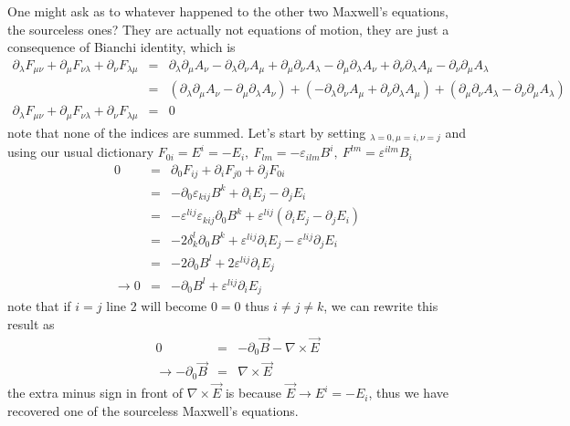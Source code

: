 \documentclass[aps,preprint,preprintnumbers,nofootinbib,showpacs,prd]{revtex4-1}
\newcommand{\nbea}{\begin{eqnarray*}}
\newcommand{\neea}{\end{eqnarray*}}
\begin{document}
One might ask as to whatever happened to the other two Maxwell's equations, the sourceless ones? They are actually not equations of motion, they are just a consequence of Bianchi identity, which is
%
\nbea
\partial_\lambda F_{\mu\nu} + \partial_\mu F_{\nu\lambda} + \partial_\nu F_{\lambda\mu} & = & \partial_\lambda\partial_\mu A_\nu - \partial_\lambda\partial_\nu A_\mu + \partial_\mu\partial_\nu A_\lambda - \partial_\mu \partial_\lambda A_\nu + \partial_\nu\partial_\lambda A_\mu - \partial_\nu\partial_\mu A_\lambda \\
& = & ( \partial_\lambda\partial_\mu A_\nu - \partial_\mu \partial_\lambda A_\nu ) + (- \partial_\lambda\partial_\nu A_\mu +  \partial_\nu\partial_\lambda A_\mu) + ( \partial_\mu\partial_\nu A_\lambda - \partial_\nu\partial_\mu A_\lambda) \\
\partial_\lambda F_{\mu\nu} + \partial_\mu F_{\nu\lambda} + \partial_\nu F_{\lambda\mu} & = & 0
\neea
%
note that none of the indices are summed. Let's start by setting $_{\lambda = 0, \mu = i, \nu =j}$ and using our usual dictionary $F_{0 i} =  E^i = -E_i, ~F_{lm} = -\varepsilon_{ilm} B^i,~ F^{lm} = \varepsilon^{ilm} B_i$
%
\nbea
0 & = & \partial_0 F_{ij} + \partial_i F_{j 0} + \partial_j F_{0 i} \\
& = & - \partial_0 \varepsilon_{kij} B^k + \partial_i E_j - \partial_j E_i \\
& = & -  \varepsilon^{lij} \varepsilon_{kij} \partial_0 B^k + \varepsilon^{lij} (\partial_i E_j - \partial_j E_i )\\
& = & - 2 \delta^l_k \partial_0 B^k + \varepsilon^{lij} \partial_i E_j - \varepsilon^{lij}  \partial_j E_i \\
& = & -2 \partial_0 B^l + 2 \varepsilon^{lij} \partial_i E_j \\
\rightarrow 0 & = & -\partial_0 B^l + \varepsilon^{lij} \partial_i E_j 
\neea
%
note that if $ i = j$ line 2 will become $0=0$ thus $i \neq j \neq k$, we can rewrite this result as
%
\nbea
0 & = & -\partial_0 \vec B - \nabla \times \vec E \\
\rightarrow  -\partial_0 \vec B & = & \nabla \times \vec E
\neea
%
the extra minus sign in front of $\nabla \times \vec E$ is because $\vec E \rightarrow E^i = - E_i$, thus we have recovered one of the sourceless Maxwell's equations.
\end{document}
